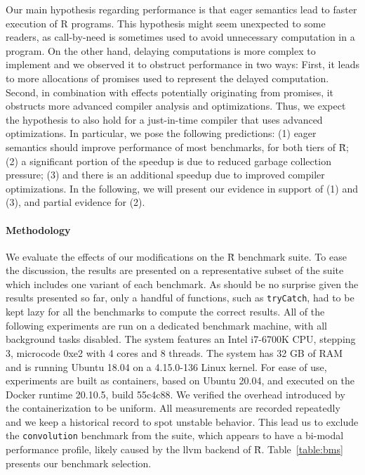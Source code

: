 \documentclass[review,nonacm,screen,acmsmall,anonymous=true]{acmart}
\renewcommand{\Rsh}{{\sf\u R}\xspace}
\begin{document}
Our main hypothesis regarding performance is that eager semantics lead to faster
execution of R programs. This hypothesis might seem unexpected to some readers,
as call-by-need is sometimes used to avoid unnecessary computation in a program.
On the other hand, delaying computations is more complex to implement and we
observed it to obstruct performance in two ways: First, it leads to more
allocations of promises used to represent the delayed computation. Second, in
combination with effects potentially originating from promises, it obstructs
more advanced compiler analysis and optimizations. Thus, we expect the hypothesis
to also hold for a just-in-time compiler that uses advanced optimizations.
In particular, we pose the following predictions:
(1) eager semantics should improve performance of most benchmarks, for both tiers
of \Rsh; (2) a significant portion of the speedup is due to reduced garbage
collection pressure; (3) and there is an additional speedup due to improved compiler
optimizations. In the following, we will present our evidence in support of (1)
and (3), and partial evidence for (2).

\paragraph{Methodology}

We evaluate the effects of our modifications on the \Rsh benchmark suite.
To ease the discussion, the results are presented on a representative subset of
the suite which includes one variant of
each benchmark. As should be no surprise given the results presented so far,
only a handful of functions, such as
\lstinline{tryCatch}, had to be kept lazy for all the benchmarks to compute
the correct results.
All of the following experiments are run on a dedicated benchmark machine, with
all background tasks disabled. The system features an Intel i7-6700K CPU, stepping 3,
microcode 0xe2 with 4 cores and 8 threads. The system has 32 GB of RAM and is
running Ubuntu 18.04 on a 4.15.0-136 Linux kernel. For ease of use, experiments
are built as containers, based on Ubuntu 20.04, and executed on
the Docker runtime 20.10.5, build 55c4c88. We verified the overhead introduced by
the containerization to be uniform. All measurements are recorded repeatedly and we
keep a historical record to spot unstable behavior. This lead us to exclude the
\lstinline{convolution} benchmark from the suite, which appears to have a
bi-modal performance profile, likely caused by the llvm backend of \Rsh.
Table~\ref{table:bms} presents our benchmark selection.
\end{document}
